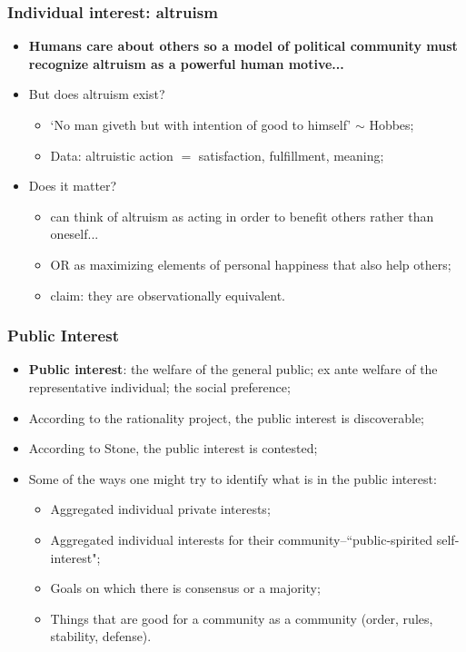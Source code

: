 \documentclass[aspectratio=169]{beamer}
\theoremstyle{principle}
\begin{document}
\begin{frame}
\frametitle{Individual interest: altruism}
\begin{itemize}
\item \textbf{Humans care about others so a model of political community must recognize altruism as a powerful human motive...}
\bigskip
\bigskip
\item But does altruism exist?
\begin{itemize}
\item `No man giveth but with intention of good to himself' $\sim$ Hobbes;
\item Data: altruistic action $=$ satisfaction, fulfillment, meaning;
\end{itemize}
\bigskip
\bigskip
\item Does it matter?
\begin{itemize}
\item can think of altruism as acting in order to benefit others rather than oneself...
\item OR as maximizing elements of personal happiness that also help others;
\item claim: they are observationally equivalent.
\end{itemize}
\end{itemize}
\end{frame}

\begin{frame}
\frametitle{Public Interest}
\begin{itemize}
\item \textbf{Public interest}: the welfare of the general public; ex ante welfare of the representative individual; the social preference;
\bigskip
\item According to the rationality project, the public interest is discoverable;
\bigskip
\bigskip
\item According to Stone, the public interest is contested;
\bigskip
\bigskip
\item Some of the ways one might try to identify what is in the public interest:
\begin{itemize}
\item Aggregated individual private interests;
\item Aggregated individual interests for their community–``public-spirited self-interest";
\item Goals on which there is consensus or a majority;
\item Things that are good for a community as a community (order, rules, stability, defense).
\end{itemize}
\end{itemize}
\end{frame}
\end{document}
